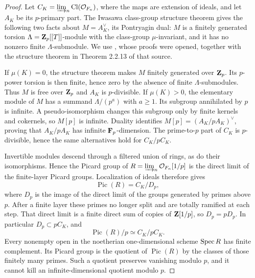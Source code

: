 \begin{proof}
Let $C_K=\varinjlim_n\operatorname{Cl}(\mathcal O_{F_n})$, where the
maps are extension of ideals, and let $A_K$ be its $p$-primary part.
The Iwasawa class-group structure theorem gives the following two
facts about $M=A_K^\vee$, its Pontryagin dual: $M$ is a finitely
generated torsion $\Lambda=\mathbf Z_p[[T]]$-module with the class-group
$\mu$-invariant, and it has no nonzero finite $\Lambda$-submodule.
We use \citet[Proposition 3.2.15 and Corollary 3.2.16]{A_SharifiIwasawa},
whose proofs were opened, together with the structure theorem in
Theorem 2.2.13 of that source.

If $\mu(K)=0$, the structure theorem makes $M$ finitely generated
over $\mathbf Z_p$. Its $p$-power torsion is then finite, hence zero by the
absence of finite $\Lambda$-submodules. Thus $M$ is free over $\mathbf Z_p$
and $A_K$ is $p$-divisible. If $\mu(K)>0$, the elementary module of
$M$ has a summand $\Lambda/(p^a)$ with $a\geq1$. Its subgroup
annihilated by $p$ is infinite. A pseudo-isomorphism changes this
subgroup only by finite kernels and cokernels, so $M[p]$ is infinite.
Duality identifies $M[p]=(A_K/pA_K)^\vee$, proving that $A_K/pA_K$
has infinite $\mathbf F_p$-dimension. The prime-to-$p$ part of $C_K$ is
$p$-divisible, hence the same alternatives hold for $C_K/pC_K$.

Invertible modules descend through a filtered union of rings, as do their isomorphisms. Hence the Picard group of $R=\varinjlim_n\mathcal O_{F_n}[1/p]$ is the direct limit of the finite-layer Picard groups. Localization of ideals therefore gives
\[
 \operatorname{Pic}(R)=C_K/D_p,
\]
where $D_p$ is the image of the direct limit of the groups generated
by primes above $p$. After a finite layer these primes no longer
split and are totally ramified at each step. That direct limit is a
finite direct sum of copies of $\mathbf Z[1/p]$, so $D_p=pD_p$.
In particular $D_p\subset pC_K$, and
\[
 \operatorname{Pic}(R)/p\simeq C_K/pC_K.
\]
Every nonempty open in the noetherian one-dimensional scheme
$\operatorname{Spec} R$ has finite complement. Its Picard group is the quotient
of $\operatorname{Pic}(R)$ by the classes of those finitely many
primes. Such a quotient preserves vanishing modulo $p$, and it
cannot kill an infinite-dimensional quotient modulo $p$.


\end{proof}
